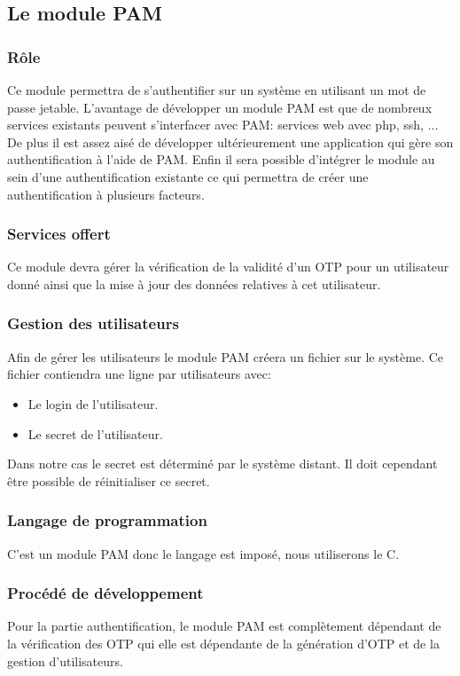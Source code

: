 \documentclass{"../../res/univ-projet"}
\begin{document}
  
\subsection{Le module PAM}
\subsubsection{Rôle}
  Ce module permettra de s'authentifier sur un système en utilisant un mot de passe
  jetable. L'avantage de développer un module PAM est que de nombreux services existants
  peuvent s'interfacer avec PAM: services web avec php, ssh, ... De plus il est assez
  aisé de développer ultérieurement une application qui gère son authentification à l'aide de PAM.
  Enfin il sera possible d'intégrer le module au sein d'une authentification existante ce qui permettra
  de créer une authentification à plusieurs facteurs.
  
  
\subsubsection{Services offert}
  Ce module devra gérer la vérification de la validité d'un OTP pour un utilisateur donné ainsi que la
  mise à jour des données relatives à cet utilisateur.
  
\subsubsection{Gestion des utilisateurs}
  Afin de gérer les utilisateurs le module PAM créera un fichier sur le système.
  Ce fichier contiendra une ligne par utilisateurs avec:
  \begin{itemize}
   \item Le login de l'utilisateur.
   \item Le secret de l'utilisateur.
  \end{itemize}
  
  Dans notre cas le secret est déterminé par le système distant. Il doit
  cependant être possible de réinitialiser ce secret. 
  
\subsubsection{Langage de programmation}
  C'est un module PAM donc le langage est imposé, nous utiliserons le C.
  
\subsubsection{Procédé de développement}
  Pour la partie authentification, le module PAM est complètement
  dépendant de la vérification des OTP qui elle est dépendante de la 
  génération d'OTP et de la gestion d'utilisateurs.
\end{document}
